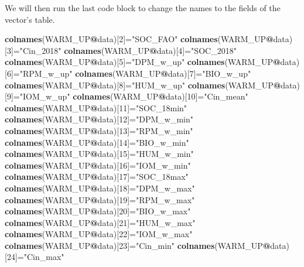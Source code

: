 \documentclass[
  10pt,
  b5paper,
]{book}
\newenvironment{Shaded}{\begin{snugshade}}{\end{snugshade}}
\newcommand{\DecValTok}[1]{\textcolor[rgb]{0.00,0.00,0.81}{#1}}
\newcommand{\KeywordTok}[1]{\textcolor[rgb]{0.13,0.29,0.53}{\textbf{#1}}}
\newcommand{\NormalTok}[1]{#1}
\newcommand{\OperatorTok}[1]{\textcolor[rgb]{0.81,0.36,0.00}{\textbf{#1}}}
\newcommand{\StringTok}[1]{\textcolor[rgb]{0.31,0.60,0.02}{#1}}
\begin{document}
We will then run the last code block to change the names to the fields of the vector's table.

\begin{Shaded}
\begin{Highlighting}[]
\KeywordTok{colnames}\NormalTok{(WARM_UP}\OperatorTok{@}\NormalTok{data)[}\DecValTok{2}\NormalTok{]=}\StringTok{"SOC_FAO"}
\KeywordTok{colnames}\NormalTok{(WARM_UP}\OperatorTok{@}\NormalTok{data)[}\DecValTok{3}\NormalTok{]=}\StringTok{"Cin_2018"}
\KeywordTok{colnames}\NormalTok{(WARM_UP}\OperatorTok{@}\NormalTok{data)[}\DecValTok{4}\NormalTok{]=}\StringTok{"SOC_2018"}
\KeywordTok{colnames}\NormalTok{(WARM_UP}\OperatorTok{@}\NormalTok{data)[}\DecValTok{5}\NormalTok{]=}\StringTok{"DPM_w_up"}
\KeywordTok{colnames}\NormalTok{(WARM_UP}\OperatorTok{@}\NormalTok{data)[}\DecValTok{6}\NormalTok{]=}\StringTok{"RPM_w_up"}
\KeywordTok{colnames}\NormalTok{(WARM_UP}\OperatorTok{@}\NormalTok{data)[}\DecValTok{7}\NormalTok{]=}\StringTok{"BIO_w_up"}
\KeywordTok{colnames}\NormalTok{(WARM_UP}\OperatorTok{@}\NormalTok{data)[}\DecValTok{8}\NormalTok{]=}\StringTok{"HUM_w_up"}
\KeywordTok{colnames}\NormalTok{(WARM_UP}\OperatorTok{@}\NormalTok{data)[}\DecValTok{9}\NormalTok{]=}\StringTok{"IOM_w_up"}
\KeywordTok{colnames}\NormalTok{(WARM_UP}\OperatorTok{@}\NormalTok{data)[}\DecValTok{10}\NormalTok{]=}\StringTok{"Cin_mean"}
\KeywordTok{colnames}\NormalTok{(WARM_UP}\OperatorTok{@}\NormalTok{data)[}\DecValTok{11}\NormalTok{]=}\StringTok{"SOC_18min"}
\KeywordTok{colnames}\NormalTok{(WARM_UP}\OperatorTok{@}\NormalTok{data)[}\DecValTok{12}\NormalTok{]=}\StringTok{"DPM_w_min"}
\KeywordTok{colnames}\NormalTok{(WARM_UP}\OperatorTok{@}\NormalTok{data)[}\DecValTok{13}\NormalTok{]=}\StringTok{"RPM_w_min"}
\KeywordTok{colnames}\NormalTok{(WARM_UP}\OperatorTok{@}\NormalTok{data)[}\DecValTok{14}\NormalTok{]=}\StringTok{"BIO_w_min"}
\KeywordTok{colnames}\NormalTok{(WARM_UP}\OperatorTok{@}\NormalTok{data)[}\DecValTok{15}\NormalTok{]=}\StringTok{"HUM_w_min"}
\KeywordTok{colnames}\NormalTok{(WARM_UP}\OperatorTok{@}\NormalTok{data)[}\DecValTok{16}\NormalTok{]=}\StringTok{"IOM_w_min"}
\KeywordTok{colnames}\NormalTok{(WARM_UP}\OperatorTok{@}\NormalTok{data)[}\DecValTok{17}\NormalTok{]=}\StringTok{"SOC_18max"}
\KeywordTok{colnames}\NormalTok{(WARM_UP}\OperatorTok{@}\NormalTok{data)[}\DecValTok{18}\NormalTok{]=}\StringTok{"DPM_w_max"}
\KeywordTok{colnames}\NormalTok{(WARM_UP}\OperatorTok{@}\NormalTok{data)[}\DecValTok{19}\NormalTok{]=}\StringTok{"RPM_w_max"}
\KeywordTok{colnames}\NormalTok{(WARM_UP}\OperatorTok{@}\NormalTok{data)[}\DecValTok{20}\NormalTok{]=}\StringTok{"BIO_w_max"}
\KeywordTok{colnames}\NormalTok{(WARM_UP}\OperatorTok{@}\NormalTok{data)[}\DecValTok{21}\NormalTok{]=}\StringTok{"HUM_w_max"}
\KeywordTok{colnames}\NormalTok{(WARM_UP}\OperatorTok{@}\NormalTok{data)[}\DecValTok{22}\NormalTok{]=}\StringTok{"IOM_w_max"}
\KeywordTok{colnames}\NormalTok{(WARM_UP}\OperatorTok{@}\NormalTok{data)[}\DecValTok{23}\NormalTok{]=}\StringTok{"Cin_min"}
\KeywordTok{colnames}\NormalTok{(WARM_UP}\OperatorTok{@}\NormalTok{data)[}\DecValTok{24}\NormalTok{]=}\StringTok{"Cin_max"}
\end{Highlighting}
\end{Shaded}
\end{document}
